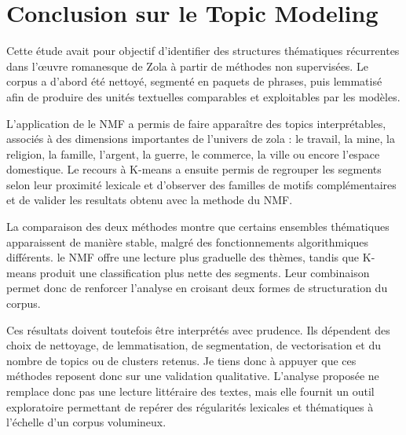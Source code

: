 \section{Conclusion sur le Topic Modeling}

Cette étude avait pour objectif d'identifier des structures thématiques récurrentes dans l'œuvre romanesque de Zola à partir de méthodes non supervisées. Le corpus a d'abord été nettoyé, segmenté en paquets de phrases, puis lemmatisé afin de produire des unités textuelles comparables et exploitables par les modèles.

L'application de le NMF a permis de faire apparaître des topics interprétables, associés à des dimensions importantes de l'univers de zola : le travail, la mine, la religion, la famille, l'argent, la guerre, le commerce, la ville ou encore l'espace domestique. Le recours à K-means a ensuite permis de regrouper les segments selon leur proximité lexicale et d'observer des familles de motifs complémentaires et de valider les resultats obtenu avec la methode du NMF.

La comparaison des deux méthodes montre que certains ensembles thématiques apparaissent de manière stable, malgré des fonctionnements algorithmiques différents. le NMF offre une lecture plus graduelle des thèmes, tandis que K-means produit une classification plus nette des segments. Leur combinaison permet donc de renforcer l'analyse en croisant deux formes de structuration du corpus.

Ces résultats doivent toutefois être interprétés avec prudence. Ils dépendent des choix de nettoyage, de lemmatisation, de segmentation, de vectorisation et du nombre de topics ou de clusters retenus. Je tiens donc à appuyer que ces méthodes reposent donc sur une validation qualitative. L'analyse proposée ne remplace donc pas une lecture littéraire des textes, mais elle fournit un outil exploratoire permettant de repérer des régularités lexicales et thématiques à l'échelle d'un corpus volumineux.
